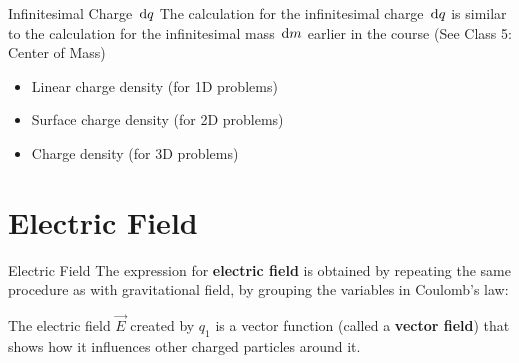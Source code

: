 \documentclass[12pt,aspectratio=169]{beamer}
\begin{document}
\begin{frame}{Infinitesimal Charge $\dl q$}
  The calculation for the infinitesimal charge $\dl q$ is similar to the
  calculation for the infinitesimal mass $\dl m$ earlier in the course (See
  Class 5: Center of Mass)
  \begin{itemize}
  \item Linear charge density (for 1D problems)


  \item Surface charge density (for 2D problems)


  \item Charge density (for 3D problems)

  \end{itemize}
\end{frame}

    

\section{Electric Field}

\begin{frame}{Electric Field}
  The expression for \textbf{electric field} is obtained by repeating the same
  procedure as with gravitational field, by grouping the variables in
  Coulomb's law:


  The electric field $\vec E$ created by $q_1$ is a vector function (called a
  \textbf{vector field}) that shows how it influences other charged particles
  around it.
\end{frame}
\end{document}
